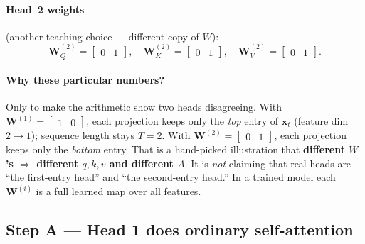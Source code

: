 \documentclass[11pt]{article}
\begin{document}
\paragraph{Head~2 weights} (another teaching choice --- different copy of \(W\)):
\[
  \mathbf{W}_Q^{(2)}=\begin{bmatrix}0&1\end{bmatrix},\quad
  \mathbf{W}_K^{(2)}=\begin{bmatrix}0&1\end{bmatrix},\quad
  \mathbf{W}_V^{(2)}=\begin{bmatrix}0&1\end{bmatrix}.
\]

\paragraph{Why these particular numbers?}
Only to make the arithmetic show two heads disagreeing. With
\(\mathbf{W}^{(1)}=\begin{bmatrix}1&0\end{bmatrix}\), each projection
keeps only the \emph{top} entry of \(\mathbf{x}_t\) (feature dim
\(2\to 1\)); sequence length stays \(T=2\). With
\(\mathbf{W}^{(2)}=\begin{bmatrix}0&1\end{bmatrix}\), each projection
keeps only the \emph{bottom} entry. That is a hand-picked illustration
that \textbf{different \(W\)'s \(\Rightarrow\) different \(q,k,v\) and
different \(A\)}. It is \emph{not} claiming that real heads are ``the
first-entry head'' and ``the second-entry head.'' In a trained model each
\(\mathbf{W}^{(i)}\) is a full learned map over all features.

\subsection{Step A --- Head 1 does ordinary self-attention}
\end{document}
